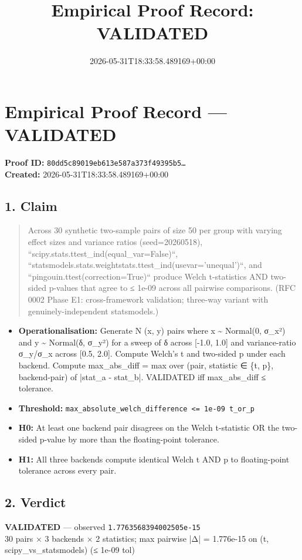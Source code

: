 \documentclass{article}
\title{Empirical Proof Record: VALIDATED}
\date{2026-05-31T18:33:58.489169+00:00}
\begin{document}
\maketitle
\section*{Empirical Proof Record --- \textcolor{validated}{\textbf{VALIDATED}}}
\textbf{Proof ID:} \texttt{80dd5c89019eb613e587a373f49395b5\dots}\\
\textbf{Created:} 2026-05-31T18:33:58.489169+00:00
\subsection*{1. Claim}
\begin{quote}Across 30 synthetic two-sample pairs of size 50 per group with varying effect sizes and variance ratios (seed=20260518), ``scipy.stats.ttest\_ind(equal\_var=False)``, ``statsmodels.stats.weightstats.ttest\_ind(usevar='unequal')``, and ``pingouin.ttest(correction=True)`` produce Welch t-statistics AND two-sided p-values that agree to ≤ 1e-09 across all pairwise comparisons. (RFC 0002 Phase E1: cross-framework validation; three-way variant with genuinely-independent statsmodels.)\end{quote}
\begin{itemize}
\item \textbf{Operationalisation:} Generate N (x, y) pairs where x \textasciitilde{} Normal(0, σ\_x²) and y \textasciitilde{} Normal(δ, σ\_y²) for a sweep of δ across [-1.0, 1.0] and variance-ratio σ\_y/σ\_x across [0.5, 2.0]. Compute Welch's t and two-sided p under each backend. Compute max\_abs\_diff = max over (pair, statistic ∈ \{t, p\}, backend-pair) of |stat\_a - stat\_b|. VALIDATED iff max\_abs\_diff ≤ tolerance.
\item \textbf{Threshold:} \texttt{max\_absolute\_welch\_difference <= 1e-09 t\_or\_p}
\item \textbf{H0:} At least one backend pair disagrees on the Welch t-statistic OR the two-sided p-value by more than the floating-point tolerance.
\item \textbf{H1:} All three backends compute identical Welch t AND p to floating-point tolerance across every pair.
\end{itemize}
\subsection*{2. Verdict}
\textcolor{validated}{\textbf{VALIDATED}} --- observed \texttt{1.7763568394002505e-15}\\
30 pairs × 3 backends × 2 statistics; max pairwise |Δ| = 1.776e-15 on (t, scipy\_vs\_statsmodels) (≤ 1e-09 tol)
\end{document}
